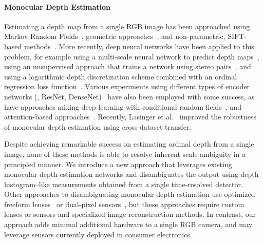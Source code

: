 

\paragraph{Monocular Depth Estimation}
%
Estimating a depth map from a single RGB image has been approached using Markov
Random Fields~\cite{Saxena2006}, geometric approaches~\cite{Hoiem2005}, and
non-parametric, SIFT-based methods~\cite{Karsch2014}. More recently, deep neural
networks have been applied to this problem, for example using a multi-scale neural network to predict depth maps~\cite{Eigen2014},
using an unsupervised approach that trains a network using stereo pairs~\cite{Godard2017}, and using a logarithmic
depth discretization scheme combined with an ordinal regression loss function~\cite{Fu2018}. Various
experiments using different types of encoder networks (\eg, ResNet,
DenseNet)~\cite{Alhashim2018,Laina2016} have also been employed with some
success, as have approaches mixing deep learning with conditional random
fields~\cite{Xu2017}, and attention-based approaches~\cite{Hao2018,Xu2018}.
Recently, Lasinger et al.~\cite{Lasinger:2019} improved the robustness of
monocular depth estimation using cross-dataset transfer.

Despite achieving remarkable success on estimating ordinal depth from a single
image, none of these methods is able to resolve inherent scale ambiguity in a
principled manner. We introduce a new approach that leverages existing monocular
depth estimation networks and disambiguates the output using depth
histogram--like measurements obtained from a single time-resolved detector. Other
approaches to disambiguating monocular depth estimation use optimized freeform
lenses~\cite{Chang:2019:DeepOptics3D,Wu:2019} or dual-pixel
sensors~\cite{Garg:2019}, but these approaches require custom lenses or sensors
and specialized image reconstruction methods. In contrast, our approach adds
minimal additional hardware to a single RGB camera, and may leverage sensors currently
deployed in consumer electronics.

